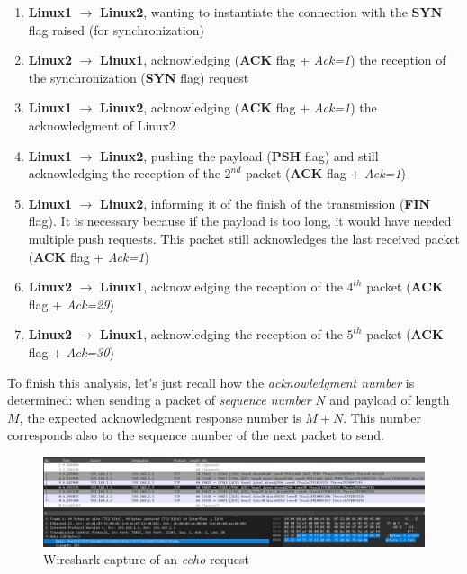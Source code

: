 \documentclass[10pt,a4paper]{ULBreport}
\begin{document}
\begin{enumerate}
    \item \textbf{Linux1} $\rightarrow$ \textbf{Linux2}, wanting to instantiate the connection with the \textbf{SYN} 
    flag raised (for synchronization)
    \item \textbf{Linux2} $\rightarrow$ \textbf{Linux1}, acknowledging (\textbf{ACK} flag + \textit{Ack=1}) the 
    reception of the synchronization (\textbf{SYN} flag) request
    \item \textbf{Linux1} $\rightarrow$ \textbf{Linux2}, acknowledging (\textbf{ACK} flag + \textit{Ack=1}) the 
    acknowledgment of Linux2
    \item \textbf{Linux1} $\rightarrow$ \textbf{Linux2}, pushing the payload (\textbf{PSH} flag) and still
    acknowledging the reception of the $2^{nd}$ packet (\textbf{ACK} flag + \textit{Ack=1})
    \item \textbf{Linux1} $\rightarrow$ \textbf{Linux2}, informing it of the finish of the transmission (\textbf{FIN}
    flag). It is necessary because if the payload is too long, it would have needed multiple push
    requests. This packet still acknowledges the last received packet (\textbf{ACK} flag + 
    \textit{Ack=1})
    \item \textbf{Linux2} $\rightarrow$ \textbf{Linux1}, acknowledging the reception of the $4^{th}$ packet
    (\textbf{ACK} flag + \textit{Ack=29})
    \item \textbf{Linux2} $\rightarrow$ \textbf{Linux1}, acknowledging the reception of the $5^{th}$ packet
    (\textbf{ACK} flag + \textit{Ack=30})
\end{enumerate}

To finish this analysis, let's just recall how the \textit{acknowledgment number} is determined:
when sending a packet of \textit{sequence number} $N$ and payload of length $M$, the expected acknowledgment response
number is $M + N$. This number corresponds also to the sequence number of the next packet to send.

\begin{figure}[H]
    \centering
    \includegraphics[width=\textwidth]{Images/wireshark0.png}
    \caption{Wireshark capture of an \textit{echo} request}
    \label{img:wireshark_1_1}
\end{figure}
\end{document}
